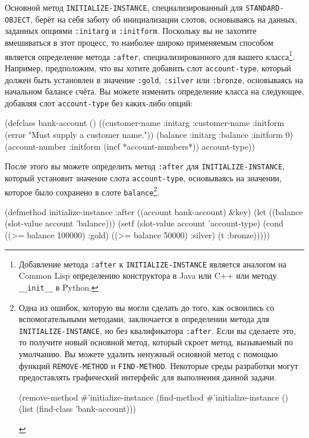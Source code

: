 Основной метод \lstinline{INITIALIZE-INSTANCE}, специализированный для \lstinline{STANDARD-OBJECT},
берёт на себя заботу об инициализации слотов, основываясь на данных, заданных опциями
\lstinline{:initarg} и \lstinline{:initform}.  Поскольку вы не захотите вмешиваться в этот процесс,
то наиболее широко применяемым способом является определение метода \lstinline{:after},
специализированного для вашего класса\footnote{Добавление метода \lstinline{:after} к
  \lstinline{INITIALIZE-INSTANCE} является аналогом на Common Lisp определению конструктора в
  Java или C++ или методу \lstinline!__init__! в Python.}.  Например, предположим, что вы
хотите добавить слот \lstinline{account-type}, который должен быть установлен в значение
\lstinline{:gold}, \lstinline{:silver} или \lstinline{:bronze}, основываясь на начальном балансе счёта.
Вы можете изменить определение класса на следующее, добавляя слот \lstinline{account-type} без
каких-либо опций:

\begin{myverb}
(defclass bank-account ()
  ((customer-name
    :initarg :customer-name
    :initform (error "Must supply a customer name."))
   (balance
    :initarg :balance
    :initform 0)
   (account-number
    :initform (incf *account-numbers*))
   account-type))
\end{myverb}

После этого вы можете определить метод \lstinline{:after} для \lstinline{INITIALIZE-INSTANCE},
который установит значение слота \lstinline{account-type}, основываясь на значении, которое
было сохранено в слоте \lstinline{balance}\footnote{Одна из ошибок, которую вы могли сделать
  до того, как освоились со вспомогательными методами, заключается в определении метода для
  \lstinline{INITIALIZE-INSTANCE}, но без квалификатора \lstinline{:after}.  Если вы сделаете это,
  то получите новый основной метод, который скроет метод, вызываемый по умолчанию.  Вы
  можете удалить ненужный основной метод с помощью функций \lstinline{REMOVE-METHOD} и
  \lstinline{FIND-METHOD}.  Некоторые среды разработки могут предоставлять графический
  интерфейс для выполнения данной задачи.

\begin{myverb}
(remove-method #'initialize-instance
  (find-method #'initialize-instance () (list (find-class 'bank-account)))
\end{myverb}
}.

\begin{myverb}
(defmethod initialize-instance :after ((account bank-account) &key)
  (let ((balance (slot-value account 'balance)))
    (setf (slot-value account 'account-type)
          (cond
            ((>= balance 100000) :gold)
            ((>= balance 50000) :silver)
            (t :bronze)))))
\end{myverb}

